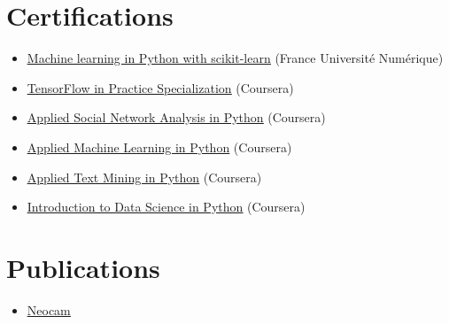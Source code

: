 \documentclass[a4paper,11pt]{article}
\newcommand{\resumeItem}[1]{
	\item\small{#1}
}
\newcommand{\resumeItemListStart}{\begin{itemize}[rightmargin=0.11in]}
\newcommand{\resumeItemListEnd}{\end{itemize}}
\begin{document}
	
	
	\section{Certifications}
	\resumeItemListStart{}
	\resumeItem{\href{https://openbadgefactory.com/v1/assertion/4d76a8035a509add2f9b01f1c19cdb9a0eef56ca.html}{\uline{Machine learning in Python with scikit-learn}} (France Universit\'e Num\'erique)}
	
	\resumeItem{\href{https://www.coursera.org/account/accomplishments/specialization/WXQQSYVFLA78}{\uline{TensorFlow in Practice Specialization}} (Coursera)}
	
	\resumeItem{\href{https://www.coursera.org/account/accomplishments/verify/JEZRF6VKSWUE}{\uline{Applied Social Network Analysis in Python}} (Coursera)}
	\resumeItem{\href{https://www.coursera.org/account/accomplishments/verify/HKSAYBJFPQGU}{\uline{Applied Machine Learning in Python}} (Coursera)}
	\resumeItem{\href{https://www.coursera.org/account/accomplishments/verify/PMFZNFG755X3}{\uline{Applied Text Mining in Python}} (Coursera)}
	\resumeItem{\href{https://www.coursera.org/account/accomplishments/verify/2SDFQS2HSAE3}{\uline{Introduction to Data Science in Python}} (Coursera)}
	
	\resumeItemListEnd{}
	
	\section{Publications}
	\resumeItemListStart{}
	\resumeItem{\href{}{\uline{Neocam}}}
	\resumeItemListEnd{}
	
\end{document}
